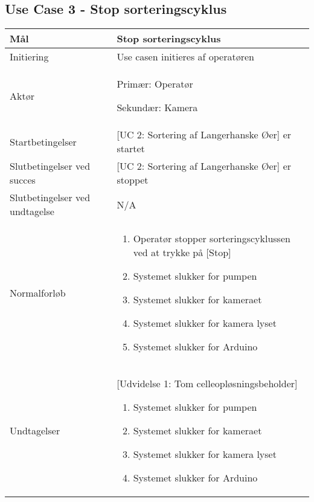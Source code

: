 \subsection{Use Case 3 - Stop sorteringscyklus}
\label{uc:3}
\begin{center}
		\begin{longtable}{ | m{4cm} | m{8cm}| } 
			\hline
			Mål & Stop sorteringscyklus \\ 
			\hline
			Initiering &  Use casen initieres af operatøren\\
			\hline
			Aktør & Primær: Operatør
			
			 Sekundær: Kamera \\ 
			\hline
			Startbetingelser & [UC 2: Sortering af Langerhanske Øer] er startet\\ 
			\hline	
			Slutbetingelser ved succes & [UC 2: Sortering af Langerhanske Øer] er stoppet \\
			\hline
			Slutbetingelser ved undtagelse & N/A \\
			\hline
			Normalforløb & \begin{enumerate}
				\item Operatør stopper sorteringscyklussen ved at trykke på [Stop]
				\subitem [Udvidelse 1: Tom celleopløsningsbeholder]
				\item Systemet slukker for pumpen
				\item Systemet slukker for kameraet
				\item Systemet slukker for kamera lyset
				\item Systemet slukker for Arduino
			\end{enumerate} \\ 
			\hline
			Undtagelser & [Udvidelse 1: Tom celleopløsningsbeholder]
			
			\begin{enumerate}
			\item Systemet slukker for pumpen
			\item Systemet slukker for kameraet
			\item Systemet slukker for kamera lyset
			\item Systemet slukker for Arduino
			\end{enumerate} \\
			\hline
		\end{longtable}
		
	\end{center}
	\pagebreak